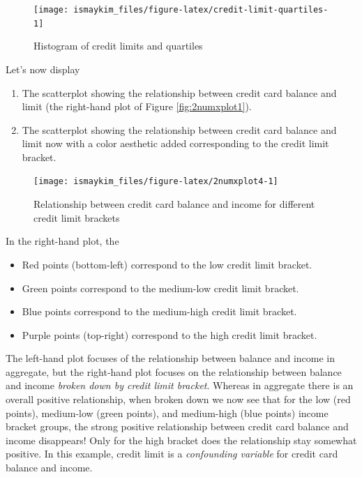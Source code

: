 \documentclass[12pt,]{krantz}
\providecommand{\tightlist}{%
  \setlength{\itemsep}{0pt}\setlength{\parskip}{0pt}}
\begin{document}
\begin{figure}

{\centering \texttt{[image: ismaykim\_files/figure-latex/credit-limit-quartiles-1]} 

}

\caption{Histogram of credit limits and quartiles}\label{fig:credit-limit-quartiles}
\end{figure}

Let's now display

\begin{enumerate}
\def\labelenumi{\arabic{enumi}.}
\tightlist
\item
  The scatterplot showing the relationship between credit card balance
  and limit (the right-hand plot of Figure \ref{fig:2numxplot1}).
\item
  The scatterplot showing the relationship between credit card balance
  and limit now with a color aesthetic added corresponding to the credit
  limit bracket.
\end{enumerate}

\begin{figure}

{\centering \texttt{[image: ismaykim\_files/figure-latex/2numxplot4-1]} 

}

\caption{Relationship between credit card balance and income for different credit limit brackets}\label{fig:2numxplot4}
\end{figure}

In the right-hand plot, the

\begin{itemize}
\tightlist
\item
  Red points (bottom-left) correspond to the low credit limit bracket.
\item
  Green points correspond to the medium-low credit limit bracket.
\item
  Blue points correspond to the medium-high credit limit bracket.
\item
  Purple points (top-right) correspond to the high credit limit bracket.
\end{itemize}

The left-hand plot focuses of the relationship between balance and
income in aggregate, but the right-hand plot focuses on the relationship
between balance and income \emph{broken down by credit limit bracket}.
Whereas in aggregate there is an overall positive relationship, when
broken down we now see that for the low (red points), medium-low (green
points), and medium-high (blue points) income bracket groups, the strong
positive relationship between credit card balance and income disappears!
Only for the high bracket does the relationship stay somewhat positive.
In this example, credit limit is a \emph{confounding variable} for
credit card balance and income.
\end{document}
